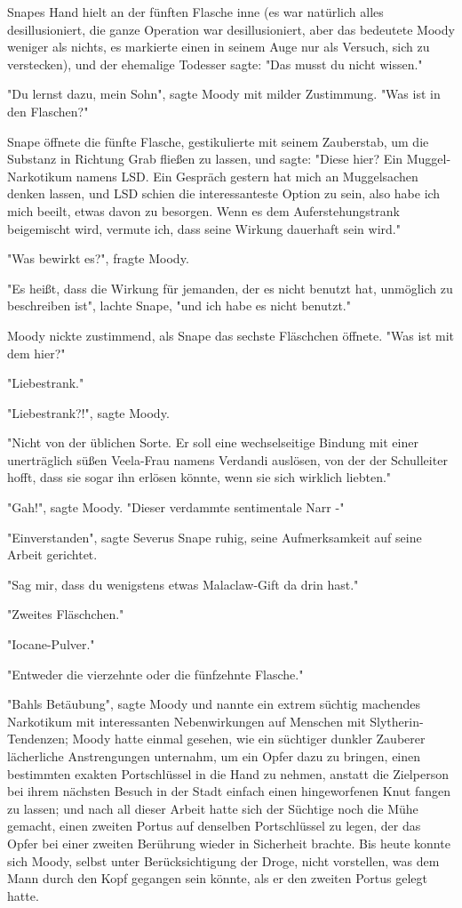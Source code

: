 {Snapes Hand hielt an der fünften Flasche inne (es war natürlich alles desillusioniert, die ganze Operation war desillusioniert, aber das bedeutete Moody weniger als nichts, es markierte einen in seinem Auge nur als Versuch, sich zu verstecken), und der ehemalige Todesser sagte: "Das musst du nicht wissen."

"Du lernst dazu, mein Sohn", sagte Moody mit milder Zustimmung. "Was ist in den Flaschen?"

Snape öffnete die fünfte Flasche, gestikulierte mit seinem Zauberstab, um die Substanz in Richtung Grab fließen zu lassen, und sagte: "Diese hier? Ein Muggel-Narkotikum namens LSD. Ein Gespräch gestern hat mich an Muggelsachen denken lassen, und LSD schien die interessanteste Option zu sein, also habe ich mich beeilt, etwas davon zu besorgen. Wenn es dem Auferstehungstrank beigemischt wird, vermute ich, dass seine Wirkung dauerhaft sein wird."

"Was bewirkt es?", fragte Moody.

"Es heißt, dass die Wirkung für jemanden, der es nicht benutzt hat, unmöglich zu beschreiben ist", lachte Snape, "und ich habe es nicht benutzt."

Moody nickte zustimmend, als Snape das sechste Fläschchen öffnete. "Was ist mit dem hier?"

"Liebestrank."

"Liebestrank?!", sagte Moody.

"Nicht von der üblichen Sorte. Er soll eine wechselseitige Bindung mit einer unerträglich süßen Veela-Frau namens Verdandi auslösen, von der der Schulleiter hofft, dass sie sogar ihn erlösen könnte, wenn sie sich wirklich liebten."

"Gah!", sagte Moody. "Dieser verdammte sentimentale Narr -"

"Einverstanden", sagte Severus Snape ruhig, seine Aufmerksamkeit auf seine Arbeit gerichtet.

"Sag mir, dass du wenigstens etwas Malaclaw-Gift da drin hast."

"Zweites Fläschchen."

"Iocane-Pulver."

"Entweder die vierzehnte oder die fünfzehnte Flasche."

"Bahls Betäubung", sagte Moody und nannte ein extrem süchtig machendes Narkotikum mit interessanten Nebenwirkungen auf Menschen mit Slytherin-Tendenzen; Moody hatte einmal gesehen, wie ein süchtiger dunkler Zauberer lächerliche Anstrengungen unternahm, um ein Opfer dazu zu bringen, einen bestimmten exakten Portschlüssel in die Hand zu nehmen, anstatt die Zielperson bei ihrem nächsten Besuch in der Stadt einfach einen hingeworfenen Knut fangen zu lassen; und nach all dieser Arbeit hatte sich der Süchtige noch die Mühe gemacht, einen zweiten Portus auf denselben Portschlüssel zu legen, der das Opfer bei einer zweiten Berührung wieder in Sicherheit brachte. Bis heute konnte sich Moody, selbst unter Berücksichtigung der Droge, nicht vorstellen, was dem Mann durch den Kopf gegangen sein könnte, als er den zweiten Portus gelegt hatte.

}
